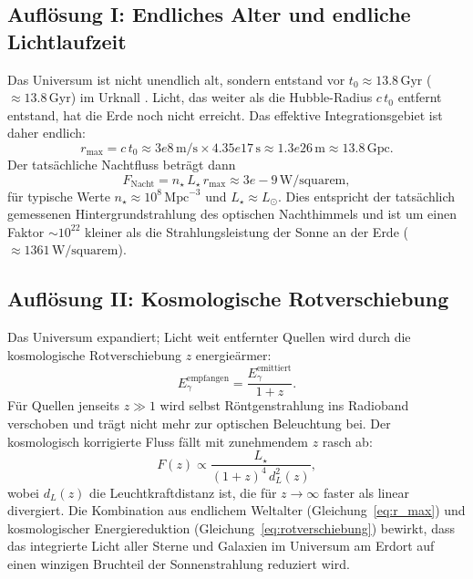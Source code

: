 \documentclass[12pt,a4paper]{article}
\providecommand{\SI}[2]{\ensuremath{#1\,#2}}
\providecommand{\num}[1]{#1}
\providecommand{\giga}{\mathrm{G}}
\providecommand{\per}{/}
\providecommand{\square}{\mathrm{square}}
\providecommand{\watt}{\mathrm{W}}
\providecommand{\metre}{\mathrm{m}}
\providecommand{\second}{\mathrm{s}}
\providecommand{\year}{\mathrm{yr}}
\renewcommand{\year}{\mathrm{yr}}
\begin{document}
\subsection{Auflösung I: Endliches Alter und endliche Lichtlaufzeit}

Das Universum ist nicht unendlich alt, sondern entstand vor
$t_0 \approx \SI{13.8}{\giga\year}$ ($\approx \num{13.8}\,\mathrm{Gyr}$) im Urknall
\citep{Planck2018}.
Licht, das weiter als die Hubble-Radius $c\,t_0$ entfernt
entstand, hat die Erde noch nicht erreicht.
Das effektive Integrationsgebiet ist daher endlich:
\begin{equation}
  r_{\max} = c\,t_0
    \approx \SI{3e8}{\metre\per\second} \times \SI{4.35e17}{\second}
    \approx \SI{1.3e26}{\metre} \approx 13.8\,\mathrm{Gpc}.
  \label{eq:r_max}
\end{equation}
Der tatsächliche Nachtfluss beträgt dann
\begin{equation}
  F_{\mathrm{Nacht}} = n_\star\,L_\star\,r_{\max}
    \approx \SI{3e-9}{\watt\per\square\metre},
  \label{eq:F_nacht}
\end{equation}
für typische Werte $n_\star \approx 10^{8}\,\mathrm{Mpc}^{-3}$
und $L_\star \approx L_\odot$.
Dies entspricht der tatsächlich gemessenen Hintergrundstrahlung
des optischen Nachthimmels und ist um einen Faktor
$\sim 10^{22}$ kleiner als die Strahlungsleistung der Sonne
an der Erde ($\approx \SI{1361}{\watt\per\square\metre}$).

\subsection{Auflösung II: Kosmologische Rotverschiebung}

Das Universum expandiert; Licht weit entfernter Quellen wird
durch die kosmologische Rotverschiebung $z$ energieärmer:
\begin{equation}
  E_\gamma^{\mathrm{empfangen}} = \frac{E_\gamma^{\mathrm{emittiert}}}{1+z}.
  \label{eq:rotverschiebung}
\end{equation}
Für Quellen jenseits $z \gg 1$ wird selbst Röntgenstrahlung
ins Radioband verschoben und trägt nicht mehr zur optischen
Beleuchtung bei.
Der kosmologisch korrigierte Fluss fällt mit zunehmendem $z$
rasch ab:
\begin{equation}
  F(z) \propto \frac{L_\star}{(1+z)^4\,d_L^2(z)},
  \label{eq:F_korr}
\end{equation}
wobei $d_L(z)$ die Leuchtkraftdistanz ist, die für $z \to \infty$
faster als linear divergiert.
Die Kombination aus endlichem Weltalter
(Gleichung~\ref{eq:r_max}) und
kosmologischer Energiereduktion (Gleichung~\ref{eq:rotverschiebung})
bewirkt, dass das integrierte Licht aller Sterne und Galaxien
im Universum am Erdort auf einen winzigen Bruchteil der
Sonnenstrahlung reduziert wird.
\end{document}
